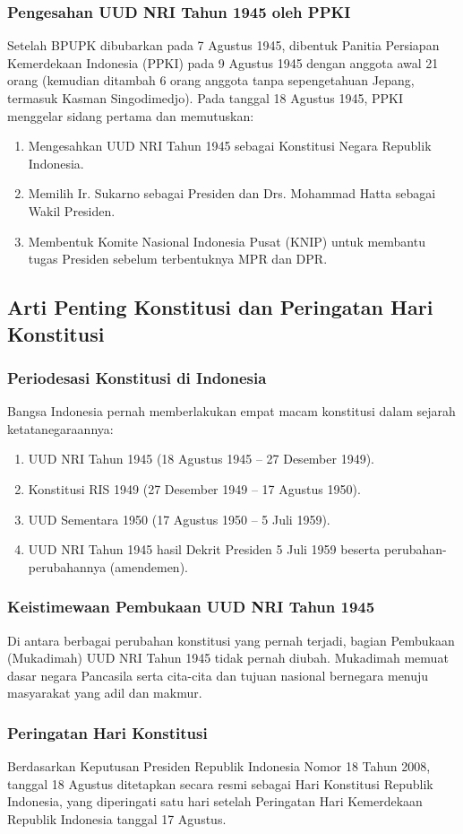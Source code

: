 \subsubsection{Pengesahan UUD NRI Tahun 1945 oleh PPKI}
Setelah BPUPK dibubarkan pada 7 Agustus 1945, dibentuk Panitia Persiapan Kemerdekaan Indonesia (PPKI) pada 9 Agustus 1945 dengan anggota awal 21 orang (kemudian ditambah 6 orang anggota tanpa sepengetahuan Jepang, termasuk Kasman Singodimedjo). Pada tanggal 18 Agustus 1945, PPKI menggelar sidang pertama dan memutuskan:
\begin{enumerate}
\item Mengesahkan UUD NRI Tahun 1945 sebagai Konstitusi Negara Republik Indonesia.
\item Memilih Ir. Sukarno sebagai Presiden dan Drs. Mohammad Hatta sebagai Wakil Presiden.
\item Membentuk Komite Nasional Indonesia Pusat (KNIP) untuk membantu tugas Presiden sebelum terbentuknya MPR dan DPR.
\end{enumerate}

\subsection{Arti Penting Konstitusi dan Peringatan Hari Konstitusi}
\subsubsection{Periodesasi Konstitusi di Indonesia}
Bangsa Indonesia pernah memberlakukan empat macam konstitusi dalam sejarah ketatanegaraannya:
\begin{enumerate}
\item UUD NRI Tahun 1945 (18 Agustus 1945 -- 27 Desember 1949).
\item Konstitusi RIS 1949 (27 Desember 1949 -- 17 Agustus 1950).
\item UUD Sementara 1950 (17 Agustus 1950 -- 5 Juli 1959).
\item UUD NRI Tahun 1945 hasil Dekrit Presiden 5 Juli 1959 beserta perubahan-perubahannya (amendemen).
\end{enumerate}

\subsubsection{Keistimewaan Pembukaan UUD NRI Tahun 1945}
Di antara berbagai perubahan konstitusi yang pernah terjadi, bagian Pembukaan (Mukadimah) UUD NRI Tahun 1945 tidak pernah diubah. Mukadimah memuat dasar negara Pancasila serta cita-cita dan tujuan nasional bernegara menuju masyarakat yang adil dan makmur.

\subsubsection{Peringatan Hari Konstitusi}
Berdasarkan Keputusan Presiden Republik Indonesia Nomor 18 Tahun 2008, tanggal 18 Agustus ditetapkan secara resmi sebagai Hari Konstitusi Republik Indonesia, yang diperingati satu hari setelah Peringatan Hari Kemerdekaan Republik Indonesia tanggal 17 Agustus.
